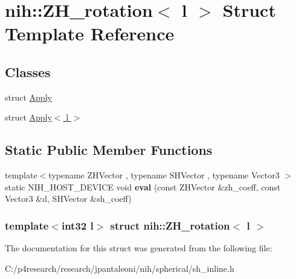 \hypertarget{structnih_1_1_z_h__rotation}{
\section{nih\-:\-:\-Z\-H\-\_\-rotation$<$ l $>$ \-Struct \-Template \-Reference}
\label{structnih_1_1_z_h__rotation}
}
\subsection*{\-Classes}
\begin{DoxyCompactItemize}
\item 
struct \hyperlink{structnih_1_1_z_h__rotation_1_1_apply}{\-Apply}
\item 
struct \hyperlink{structnih_1_1_z_h__rotation_1_1_apply_3_01l_01_4}{\-Apply$<$ l $>$}
\end{DoxyCompactItemize}
\subsection*{\-Static \-Public \-Member \-Functions}
\begin{DoxyCompactItemize}
\item 
\hypertarget{structnih_1_1_z_h__rotation_a7c9183edef6e97233ea6b19330f6172d}{
{\footnotesize template$<$typename Z\-H\-Vector , typename S\-H\-Vector , typename Vector3 $>$ }\\static \-N\-I\-H\-\_\-\-H\-O\-S\-T\-\_\-\-D\-E\-V\-I\-C\-E void {\bfseries eval} (const \-Z\-H\-Vector \&zh\-\_\-coeff, const \-Vector3 \&d, \-S\-H\-Vector \&sh\-\_\-coeff)}
\label{structnih_1_1_z_h__rotation_a7c9183edef6e97233ea6b19330f6172d}

\end{DoxyCompactItemize}
\subsubsection*{template$<$int32 l$>$ struct nih\-::\-Z\-H\-\_\-rotation$<$ l $>$}



\-The documentation for this struct was generated from the following file\-:\begin{DoxyCompactItemize}
\item 
\-C\-:/p4research/research/jpantaleoni/nih/spherical/sh\-\_\-inline.\-h\end{DoxyCompactItemize}
